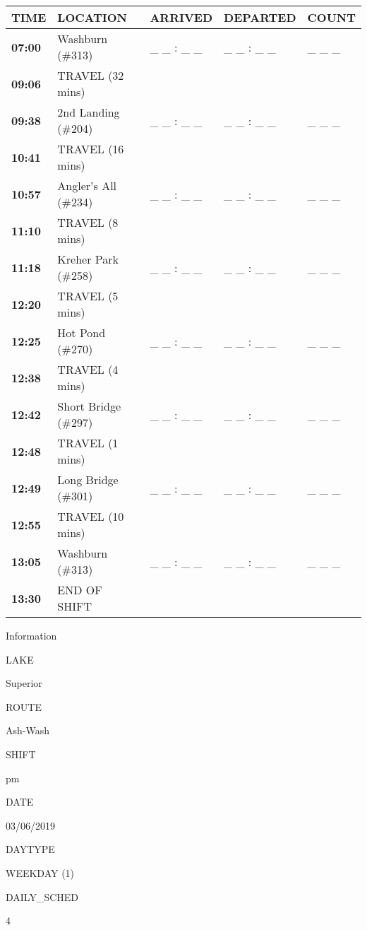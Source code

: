 \documentclass[]{article}
\begin{document}
\begin{tabular}{>{\bfseries}lllll}
\toprule
\textbf{TIME} & \textbf{LOCATION} & \textbf{ARRIVED} & \textbf{DEPARTED} & \textbf{COUNT}\\
\midrule
07:00 & Washburn (\#313) & \_ \_ : \_ \_ & \_ \_ : \_ \_ & \_ \_ \_\\
09:06 & TRAVEL (32 mins) &  &  & \\
09:38 & 2nd Landing (\#204) & \_ \_ : \_ \_ & \_ \_ : \_ \_ & \_ \_ \_\\
10:41 & TRAVEL (16 mins) &  &  & \\
10:57 & Angler's All (\#234) & \_ \_ : \_ \_ & \_ \_ : \_ \_ & \_ \_ \_\\
11:10 & TRAVEL (8 mins) &  &  & \\
11:18 & Kreher Park (\#258) & \_ \_ : \_ \_ & \_ \_ : \_ \_ & \_ \_ \_\\
12:20 & TRAVEL (5 mins) &  &  & \\
12:25 & Hot Pond (\#270) & \_ \_ : \_ \_ & \_ \_ : \_ \_ & \_ \_ \_\\
12:38 & TRAVEL (4 mins) &  &  & \\
12:42 & Short Bridge (\#297) & \_ \_ : \_ \_ & \_ \_ : \_ \_ & \_ \_ \_\\
12:48 & TRAVEL (1 mins) &  &  & \\
12:49 & Long Bridge (\#301) & \_ \_ : \_ \_ & \_ \_ : \_ \_ & \_ \_ \_\\
12:55 & TRAVEL (10 mins) &  &  & \\
13:05 & Washburn (\#313) & \_ \_ : \_ \_ & \_ \_ : \_ \_ & \_ \_ \_\\
13:30 & END OF SHIFT &  &  & \\
\bottomrule
\end{tabular}\newpage

Information

LAKE

Superior

ROUTE

Ash-Wash

SHIFT

pm

DATE

03/06/2019

DAYTYPE

WEEKDAY (1)

DAILY\_SCHED

4

\vspace{24pt}
\end{document}
